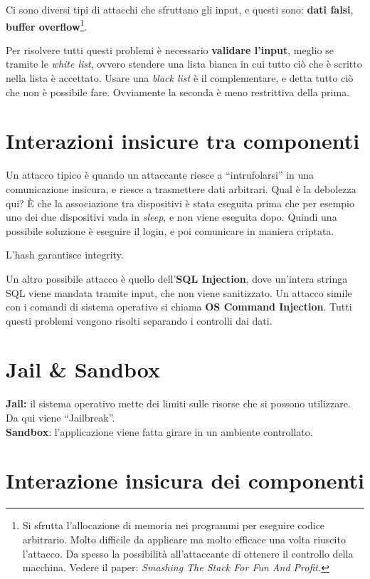 Ci sono diversi tipi di attacchi che sfruttano gli input, e questi sono: 
\textbf{dati falsi}, \textbf{buffer overflow}\footnote{Si sfrutta l'allocazione 
di memoria nei programmi per eseguire codice arbitrario. Molto difficile da 
applicare ma molto efficace una volta riuscito l'attacco. Da spesso la 
possibilità all'attaccante di ottenere il controllo della macchina. Vedere il 
paper: \textit{Smashing The Stack For Fun And Profit.}}.

Per risolvere tutti questi problemi è necessario \textbf{validare l'input}, 
meglio se tramite le \textit{white list}, ovvero stendere una lista bianca in 
cui tutto ciò che è scritto nella lista è accettato. Usare una \textit{black 
list} è il complementare, e detta tutto ciò che non è possibile fare. Ovviamente 
la seconda è meno restrittiva della prima.

\section{Interazioni insicure tra componenti}

Un attacco tipico è quando un attaccante riesce a ``intrufolarsi'' in una 
comunicazione insicura, e riesce a trasmettere dati arbitrari.
Qual è la debolezza qui? È che la associazione tra dispositivi è stata eseguita 
prima che per esempio uno dei due dispositivi vada in \textit{sleep}, e non 
viene eseguita dopo. Quindi una possibile soluzione è eseguire il login, e poi 
comunicare in maniera criptata.

L'hash garantisce integrity.

Un altro possibile attacco è quello dell'\textbf{SQL Injection}, dove un'intera 
stringa SQL viene mandata tramite input, che non viene sanitizzato. Un attacco 
simile con i comandi di sistema operativo si chiama \textbf{OS Command 
Injection}. Tutti questi problemi vengono risolti separando i controlli dai 
dati.

\section{Jail \& Sandbox}

\textbf{Jail:} il sistema operativo mette dei limiti sulle risorse che si possono 
utilizzare.
Da qui viene ``Jailbreak''.\\
\newline
\textbf{Sandbox}: l'applicazione viene fatta girare in un ambiente controllato.


\section{Interazione insicura dei componenti}

